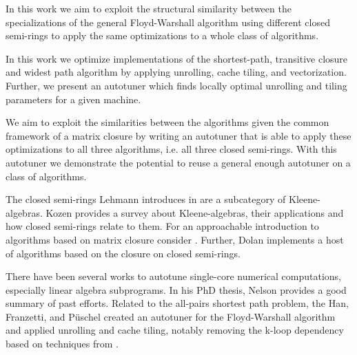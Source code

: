 In this work we aim to exploit the structural similarity between the specializations of the general
Floyd-Warshall algorithm using different closed semi-rings to apply the same optimizations to a whole
class of algorithms. 

In this work we optimize implementations of the shortest-path, transitive closure and widest path algorithm
by applying unrolling, cache tiling, and vectorization. Further, we present an autotuner which finds locally
optimal unrolling and tiling parameters for a given machine.

We aim to exploit the similarities between the algorithms given the common framework of a matrix closure by
writing an autotuner that is able to apply these optimizations to all three algorithms, i.e. all three closed
semi-rings. With this autotuner we demonstrate the potential to reuse a general enough autotuner on a class
of algorithms.

The closed semi-rings Lehmann introduces in \cite{lehmann77algebraic} are a subcategory of Kleene-algebras.
Kozen provides a survey \cite{kozen1990kleene} about Kleene-algebras, their applications and how closed
semi-rings relate to them. For an approachable introduction to algorithms based on matrix closure consider
\cite{aho1974design, mehlhorn1984algo}. Further, Dolan \cite{dolan2013fun} implements a host of
algorithms based on the closure on closed semi-rings.

There have been several works to autotune single-core numerical computations, especially linear algebra
subprograms. In his PhD thesis, Nelson \cite{nelson2015dsl} provides a good summary of past efforts.
Related to the all-pairs shortest path problem, the Han, Franzetti, and Püschel \cite{han06generation}
created an autotuner for the Floyd-Warshall algorithm and applied unrolling and cache tiling,
notably removing the k-loop dependency based on techniques from \cite{venkataraman2000blocked, park2004cache}.


